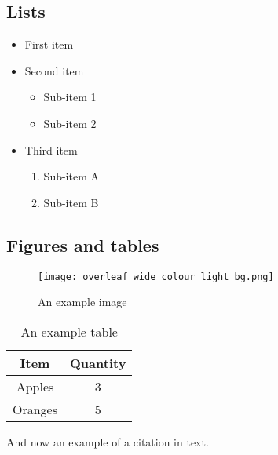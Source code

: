 \documentclass{article}
\begin{document}
\subsection{Lists}

\begin{itemize}
  \item First item
  \item Second item
    \begin{itemize}
      \item Sub-item 1
      \item Sub-item 2
    \end{itemize}
  \item Third item
     \begin{enumerate}
      \item Sub-item A
      \item Sub-item B
    \end{enumerate}
    
\end{itemize}

\subsection{Figures and tables}

\begin{figure}[H]
  \texttt{[image: overleaf\_wide\_colour\_light\_bg.png]}
  \caption{An example image}
\end{figure}

\begin{table}[H]
  \centering
  \begin{tabular}{|c|c|}
    \hline
    Item & Quantity \\
    \hline
    Apples & 3 \\
    Oranges & 5 \\
    \hline
  \end{tabular}
  \caption{An example table}
\end{table}

And now an example of a citation \cite{goossens1994latex} in text.


\end{document}
